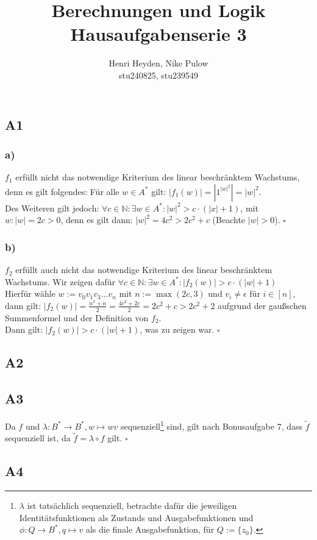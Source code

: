 \documentclass[12pt, a4paper]{article}
\title{Berechnungen und Logik\\Hausaufgabenserie 3}
\author{Henri Heyden, Nike Pulow \\ \small stu240825, stu239549}
\date{}
\newcommand*{\qed}{\null\nobreak\hfill\ensuremath{\square}}
\begin{document}
\maketitle

\doublespacing
\subsection*{A1}
\subsubsection*{a)}
\(f_1\) erfüllt nicht das notwendige Kriterium des linear beschränktem Wachstums, denn es gilt folgendes: Für alle \(w \in A^*\) gilt: \(|f_1(w)| = |1^{|w|^2}| = |w|^2\).\\
Des Weiteren gilt jedoch: \(\forall c \in \mathbb N: \exists w \in A^*: |w|^2 > c\cdot(|x| + 1)\), mit \(w : |w| = 2c > 0\), denn es gilt dann: \(|w|^2 = 4c^2 > 2c^2 + c\) (Beachte \(|w| > 0\)). \qed
\subsubsection*{b)}
\(f_2\) erfüllt auch nicht das notwendige Kriterium des linear beschränktem Wachstums. 
Wir zeigen dafür \(\forall c \in \mathbb N: \exists w \in A^*: |f_2(w)| > c\cdot(|w| + 1)\) \\
Hierfür wähle \(w := v_0v_1v_3 \dots v_n\) mit \(n := \max(2c, 3)\) und \(v_i \ne \epsilon\) für \(i \in [n]\), dann gilt: 
\(|f_2(w)| = \frac{n^2 + n}{2} = \frac{4c^2 + 2c}{2} = 2c^2+c > 2c^2 + 2\) aufgrund der gaußschen Summenformel und der Definition von \(f_2\).
\\Dann gilt: \(|f_2(w)| > c\cdot(|w| + 1)\), was zu zeigen war. \qed
\subsection*{A2}
\pagebreak
\subsection*{A3}
Da \(f\) und \(\lambda : B^* \rightarrow B^*, w \mapsto wv\) sequenziell\footnote[1]{\(\lambda\) ist tatsächlich sequenziell, betrachte dafür die jeweiligen Identitätsfunktionen als Zustands und Ausgabefunktionen und \(\phi : Q \rightarrow B^*, q \mapsto v\) als die finale Ausgabefunktion, für \(Q := \{z_0\}\).} sind, gilt nach Bonusaufgabe 7, dass \(\tilde{f}\) sequenziell ist, da \(\tilde{f} = \lambda \circ f\) gilt. \qed
\subsection*{A4}
\end{document}
